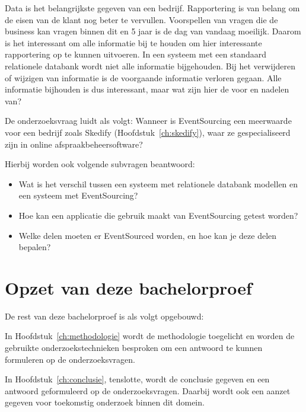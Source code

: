 Data is het belangrijkste gegeven van een bedrijf. Rapportering is van belang om de eisen van de klant nog beter te vervullen. Voorspellen van vragen die de business kan vragen binnen dit en 5 jaar is de dag van vandaag moeilijk. Daarom is het interessant om alle informatie bij te houden om hier interessante rapportering op te kunnen uitvoeren. In een systeem met een standaard relationele databank wordt niet alle informatie bijgehouden. Bij het verwijderen of wijzigen van informatie is de voorgaande informatie verloren gegaan. Alle informatie bijhouden is dus interessant, maar wat zijn hier de voor en nadelen van?

De onderzoeksvraag luidt als volgt: Wanneer is EventSourcing een meerwaarde voor een bedrijf zoals Skedify (Hoofdstuk~\ref{ch:skedify}), waar ze gespecialiseerd zijn in online afspraakbeheersoftware?

Hierbij worden ook volgende subvragen beantwoord:

\begin{itemize}
    \item Wat is het verschil tussen een systeem met relationele databank modellen en een systeem met EventSourcing?
    \item Hoe kan een applicatie die gebruik maakt van EventSourcing getest worden?
    \item Welke delen moeten er EventSourced worden, en hoe kan je deze delen bepalen?
\end{itemize}

\section{Opzet van deze bachelorproef}
\label{sec:opzet-bachelorproef}


De rest van deze bachelorproef is als volgt opgebouwd:

In Hoofdstuk~\ref{ch:methodologie} wordt de methodologie toegelicht en worden de gebruikte onderzoekstechnieken besproken om een antwoord te kunnen formuleren op de onderzoeksvragen.


In Hoofdstuk~\ref{ch:conclusie}, tenslotte, wordt de conclusie gegeven en een antwoord geformuleerd op de onderzoeksvragen. Daarbij wordt ook een aanzet gegeven voor toekomstig onderzoek binnen dit domein.

